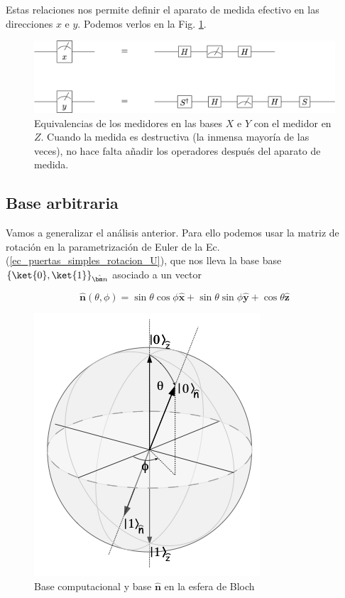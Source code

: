 \documentclass[a4paper,11pt]{book} %
\numberwithin{equation}{chapter}
\def\lch{\left\{}
\def\rch{\right\}}
\begin{document}
Estas relaciones nos permite definir el aparato de medida efectivo en las direcciones $x$ e $y$. Podemos verlos en la Fig. \ref{Fig_medidas1_meter_XYbasis}. 
    
	\begin{figure}[H]
	\centering 
	\includegraphics[width=0.8\linewidth]{Figuras/Fig_medidas1_meter_XYbasis}
	\caption{Equivalencias de los medidores en las bases $X$ e $Y$ con el medidor en $Z$. Cuando la medida es destructiva (la inmensa mayoría de las veces), no hace falta añadir los operadores después del aparato de medida.}
	\label{Fig_medidas1_meter_XYbasis}
	\end{figure}

     
        \subsection{Base arbitraria}

Vamos a generalizar el análisis anterior. Para ello podemos usar la matriz de rotación en la parametrización de Euler de la Ec. (\ref{ec_puertas_simples_rotacion_U}), que nos lleva la base base  $\lch \ket{0}, \ket{1} \rch_{\hat{\bm n}}$ asociado a un vector

\begin{equation}
\hat{\bm n} (\theta, \phi) = \sin \theta \cos \phi \hat{\bm x} + \sin \theta  \sin \phi \hat{\bm y} + \cos \theta \hat{\bm z}
\end{equation}

	\begin{figure}[H]
	\centering 
	\includegraphics[width=0.3\linewidth]{Figuras/Fig_medidas1_BlochSphere_basis}
	\caption{Base computacional y base $\hat{\bm n}$ en la esfera de Bloch}
	\label{Fig_medidas1_BlochSphere_basis}
	\end{figure}
\end{document}
